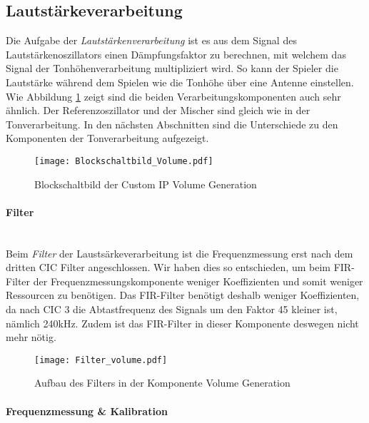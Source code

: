 \subsection{Lautstärkeverarbeitung}\label{subsec:Volume_Generation}
Die Aufgabe der \textit{Lautstärkenverarbeitung} ist es aus dem Signal des Lautstärkenoszillators einen Dämpfungsfaktor zu berechnen, mit welchem das Signal der Tonhöhenverarbeitung multipliziert wird. So kann der Spieler die Lautstärke während dem Spielen wie die Tonhöhe über eine Antenne einstellen. Wie Abbildung \ref{img:Blockschaltbild_volume} zeigt sind die beiden Verarbeitungskomponenten auch sehr ähnlich. Der Referenzoszillator und der Mischer sind gleich wie in der Tonverarbeitung. In den nächsten Abschnitten sind die Unterschiede zu den Komponenten der Tonverarbeitung aufgezeigt.



\begin{figure}[h!]
	\centering
	\texttt{[image: Blockschaltbild\_Volume.pdf]}
	\caption{Blockschaltbild der Custom IP Volume Generation} 
	\label{img:Blockschaltbild_volume}
\end{figure}  


\newpage
\paragraph{Filter}\mbox{}\\

Beim \textit{Filter} der Laustsärkeverarbeitung ist die Frequenzmessung erst nach dem dritten CIC Filter angeschlossen. Wir haben dies so entschieden, um beim FIR-Filter der Frequenzmessungskomponente weniger Koeffizienten und somit weniger Ressourcen zu benötigen. Das FIR-Filter benötigt deshalb weniger Koeffizienten, da nach CIC 3 die Abtastfrequenz des Signals um den Faktor 45 kleiner ist, nämlich 240kHz. Zudem ist das FIR-Filter in dieser Komponente deswegen nicht mehr nötig.

\begin{figure}[h!]
	\centering
	\texttt{[image: Filter\_volume.pdf]}
	\caption{Aufbau des Filters in der Komponente Volume Generation} 
	\label{img:Filter_Volume}
\end{figure}  

\paragraph{Frequenzmessung \& Kalibration}\mbox{}\\

